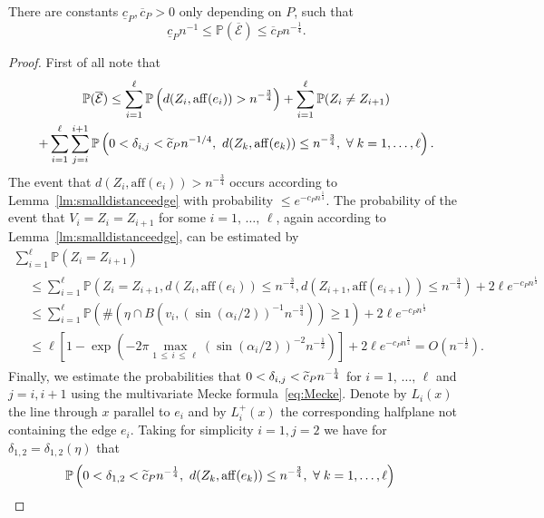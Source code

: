 \documentclass[AHL,Unicode,longabstracts,published]{cedram}
\newcommand{\bbP}{\mathbb{P}}
\newcommand{\clE}{\mathcal{E}}
\newcommand{\aff}{\mathrm{aff}}
\let\oldtilde\tilde
\renewcommand*{\tilde}[1]{\mathchoice{\widetilde{#1}}{\widetilde{#1}}{\oldtilde{#1}}{\oldtilde{#1}}}
\let\oldforall\forall
\renewcommand*{\forall}{\mathrel{\oldforall}}
\begin{document}
\begin{coro}\label{cor:complcE}
There are constants $\underline c_P, \overline c_P>0$ only depending on $P$, such that
\[
\underline c_Pn^{- 1}\leq \bbP(\overline{\clE})\leq \overline c_P n^{-\frac 14}.
\]
\end{coro}

\begin{proof}
First of all note that
\begin{multline}\label{eq:19.04.23_1}
\bbP(\overline{\clE})\leq \sum_{i=1}^\ell \bbP\left(d(Z_i, \aff(e_i)) > n^{- \frac 34}\right)+ \sum_{i=1}^\ell \bbP(Z_i\neq Z_{i+1})\\
+ \sum_{i=1}^\ell \sum_{j=i}^{i+1} \bbP\left(0<\delta_{i,j}<\tilde c_P n^{-1/4}, \ d(Z_k, \aff(e_k)) \leq n^{- \frac 34},\ \forall k=1,\ldots,\ell\right).
\end{multline}
The event that $d(Z_i, \aff(e_i)) > n^{- \frac 34}$ occurs according to Lemma~\ref{lm:smalldistanceedge} with probability $\leq e^{- c_P n^{ \frac 14} }$. The probability of the event that $V_i=Z_i=Z_{i+1}$ for some $i=1,\,\ldots,\,\ell$, again according to Lemma~\ref{lm:smalldistanceedge}, can be estimated by
\begin{multline*}
\sum_{i=1}^\ell\bbP(Z_i=Z_{i+1})
\\
\begin{aligned}
& \leq
\sum_{i=1}^\ell \bbP\left(Z_i=Z_{i+1}, d(Z_i, \aff(e_i)) \leq n^{- \frac 34}, d(Z_{i+1}, \aff(e_{i+1})) \leq n^{- \frac 34}\right) + 2\ell e^{- c_P n^{\frac 14}}
\\ & \leq
\sum_{i=1}^\ell \bbP\left(\#\left(\eta \cap B\left(v_i,(\sin(\alpha_i/2))^{-1}n^{- \frac 34}\right)\right) \geq 1\right) + 2\ell e^{- c_P n^{\frac 14}}
\\ & \leq
\ell \left[1-\exp\left(-2 \pi\max_{1\,\leq\,i\,\leq\,\ell}(\sin(\alpha_i/2))^{-2} n^{- \frac 12} \right)\right] + 2\ell e^{- c_P n^{\frac 14}} = O\left(n^{- \frac 12}\right).
\end{aligned}
\end{multline*}
Finally, we estimate the probabilities that $0<\delta_{i,j} < \tilde c_P n^{- \frac 14}$ for $i=1,\,\ldots,\,\ell$ and $j=i,i+1$ using the multivariate Mecke formula~\eqref{eq:Mecke}. Denote by $L_i(x)$ the line through $x$ parallel to $e_i$ and by $L_i^+(x)$ the corresponding halfplane not containing the edge $e_i$. Taking for simplicity $i=1, j=2$ we have for $\delta_{1,2}=\delta_{1,2}(\eta)$ that
\begin{align*}
&\bbP \left(0<\delta_{1,2} < \tilde c_P n^{- \frac 14}, \ d(Z_k, \aff(e_k)) \leq n^{- \frac 34},\ \forall k=1,\ldots,\ell \right)

\end{align*}
\end{proof}
\end{document}
